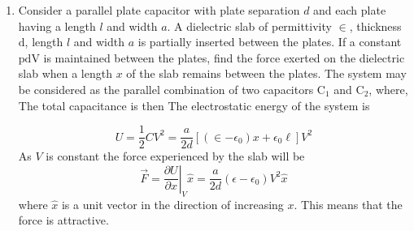 \begin{enumerate} [label=\color{ocre}\textbf{\arabic*.}]
	\begin{answer}
		(derive capacitance of two wire capacitors)
	\end{answer}
	\item Consider a parallel plate capacitor with plate separation $d$ and each plate having a length $l$ and width $a$. A dielectric slab of permittivity $\in$, thickness $\mathrm{d}$, length $l$ and width $a$ is partially inserted between the plates. If a constant $\mathrm{pd} \mathrm{V}$ is maintained between the plates, find the force exerted on the dielectric slab when a length $x$ of the slab remains between the plates.
	The system may be considered as the parallel combination of two capacitors $\mathrm{C}_{1}$ and $\mathrm{C}_{2}$, where, The total capacitance is then
	The electrostatic energy of the system is
	\begin{answer}
		$$
		U=\frac{1}{2} C V^{2}=\frac{a}{2 d}\left[\left(\in-\epsilon_{0}\right) x+\epsilon_{0} \ell\right] V^{2}
		$$
		As $V$ is constant the force experienced by the slab will be
		$$
		\vec{F}=\left.\frac{\partial U}{\partial x}\right|_{V} \hat{x}=\frac{a}{2 d}\left(\epsilon-\epsilon_{0}\right) V^{2} \hat{x}
		$$
		where $\hat{x}$ is a unit vector in the direction of increasing $x .$ This means that the force is attractive.
	\end{answer}
	

\end{enumerate}
